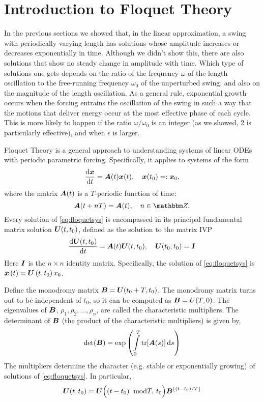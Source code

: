 


\section{Introduction to Floquet Theory}
In the previous sections we showed that, in the linear approximation, a
swing with periodically varying length has solutions whose amplitude
increases or decreases exponentially in time. Although we didn’t show
this, there are also solutions that show no steady change in amplitude
with time. Which type of solutions one gets depends on the ratio of
the frequency $\omega$ of the length oscillation to the free-running
frequency $\omega_0$ of the unperturbed swing, and also on the magnitude  of the
length oscillation. As a general rule, exponential growth occurs when
the forcing entrains the oscillation of the swing in such a way that
the motions that deliver energy occur at the most effective phase of
each cycle. This is more likely to happen if the ratio $\omega/\omega_0$ is an integer
(as we showed, 2 is particularly effective), and when $\epsilon$ is larger.  

Floquet Theory is a general approach to understanding systems of
linear ODEs with periodic parametric forcing. Specifically, it applies
to systems of the form 
\begin{equation}\label{eq:floquetsys}%
\dv{\vb{x}}{t}=\vb{A}(t)\vb{x}(t)
\qcomma \vb{x}(t_0)=:\vb{x}_0,
\end{equation}
where the matrix $\vb{A}(t)$ is a $T$-periodic function of time: 
\begin{equation}\label{eq:2}
\vb{A}(t+nT)=\vb{A}(t)\qcomma
n\in\Z.
\end{equation}
Every solution of \eqref{eq:floquetsys} is encompassed in its principal
fundamental matrix solution $\vb{U}(t,t_0)$, defined as the solution
to the matrix IVP  
\begin{equation}
\dv{\vb{U}(t,t_0)}{t}=\vb{A}(t)\vb{U}(t,t_0)\qcomma
\vb{U}(t_0,t_0)=\I
\end{equation}
Here  $\I$ is the  $n\times n$ identity matrix. Specifically, the
solution of \eqref{eq:floquetsys} is  $\vb{x}\left(t\right)=\vb{U}\left(t,{t}_{0}\right){x}_{0}$.

\bigskip
\noindent
Define the monodromy matrix $\vb{B}=\vb{U}({t}_{0}+T,{t}_{0})$. The monodromy
matrix turns out to be independent of  ${t}_{0}$, so it can be
computed as  $\vb{B}={U}(T,0)$. The eigenvalues of  $\vb{B}$,  $\rho_{1},\rho_{2},{\dots},\rho_{n}$, are called the characteristic
multipliers. The determinant of  $\vb{B}$ (the product of the
characteristic multipliers) is given by, 
\begin{equation}
\det(\vb{B})=\exp \left(
\int_{0}^{T}{\tr[\vb{A}(s)]\id{s}}
\right)
\end{equation}
The multipliers determine the character (e.g. stable or exponentially
growing) of solutions of \eqref{eq:floquetsys}. In particular, 
\begin{equation}
\vb{U}(t,{t}_{0})=
\vb{U}\Big((t-{t}_{0})\;\;\text{mod} T,\,{t}_{0}\Big)
{\vb{B}}^{\lfloor(t-{t}_{0})/T\rfloor}
\end{equation}

